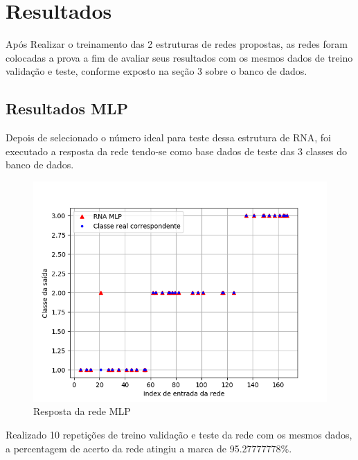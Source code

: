 \section{Resultados}
Após Realizar o treinamento das 2 estruturas de redes propostas, as redes foram colocadas a prova a fim de avaliar seus resultados com os mesmos dados de treino validação e teste, conforme exposto na seção 3 sobre o banco de dados.

\subsection{Resultados MLP}
Depois de selecionado o número ideal para teste dessa estrutura de RNA, foi executado a resposta da rede tendo-se como base dados de teste das 3 classes do banco de dados.
\begin{figure}[H]
\centering %
\includegraphics[width=\columnwidth]{04-Figuras/MLP}
\caption{Resposta da rede MLP}
\label{figura:acuracia}
\end{figure}
Realizado 10 repetições de treino validação e teste da rede com os mesmos dados, a percentagem de acerto da rede atingiu a marca de 95.27777778\%.
